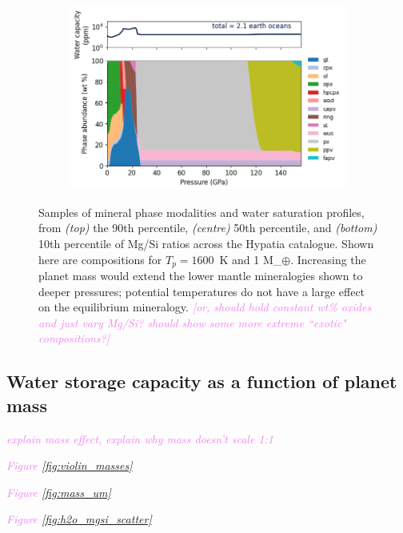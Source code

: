 \documentclass[linenumbers]{aastex631}
\newcommand{\todo}[1]{\textit{\textcolor{violet}{{#1}}}}
\begin{document}
\begin{figure}
\begin{subfigure}[b]{0.6\textwidth}
         \includegraphics[width=\textwidth]{1M_80Ceff_HIP29295_1600K_modes_c_h2o}
         \label{fig:mgsi_hypatia10}
     \end{subfigure}
        \caption{Samples of mineral phase modalities and water saturation profiles, from \textit{(top)} the 90th percentile, \textit{(centre)} 50th percentile, and \textit{(bottom)} 10th percentile of Mg/Si ratios across the Hypatia catalogue. Shown here are compositions for $T_p = 1600$~K and 1 M_$\oplus$. Increasing the planet mass would extend the lower mantle mineralogies shown to deeper pressures; potential temperatures do not have a large effect on the equilibrium mineralogy. \todo{[or, should hold constant wt\% oxides and just vary Mg/Si? should show some more extreme ``exotic" compositions?]}}
        \label{fig:mgsi_hypatia}
\end{figure}


\subsection{Water storage capacity as a function of planet mass}

\todo{explain mass effect, explain why mass doesn't scale 1:1}

\todo{Figure \ref{fig:violin_masses}}

\todo{Figure \ref{fig:mass_um}}

\todo{Figure \ref{fig:h2o_mgsi_scatter}}
\end{document}
